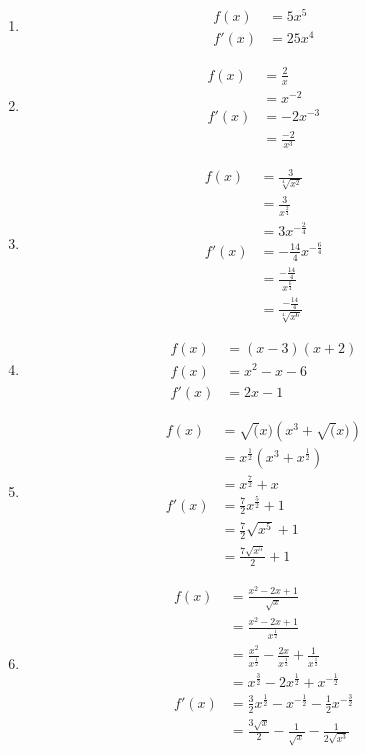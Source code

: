 \begin{enumerate}
	\item
	\begin{align*}
		f(x) &= 5x^5\\
		f'(x) &= 25x^4
	\end{align*}
	\item
	\begin{align*}
		f(x) &= \frac{2}{x}\\
		&= x^{-2}\\
		f'(x) &= -2x^{-3}\\
		&= \frac{-2}{x^3}
	\end{align*}
	\item 
	\begin{align*}
		f(x) &= \frac{3}{\sqrt[4]{x^2}}\\
		&= \frac{3}{x^{\frac{2}{4}}}\\
		&= 3x^{-\frac{2}{4}}\\
		f'(x) &= -\frac{14}{4}x^{-\frac{6}{4}}\\[0.5em]
		&= \frac{-\frac{14}{4}}{x^{\frac{6}{4}}}\\[0.5em]
		&= \frac{-\frac{14}{4}}{\sqrt[4]{x^6}}
	\end{align*}
	\item
	\begin{align*}
		f(x)&=(x-3)(x+2)\\
		f(x)&=x^2-x-6\\
		f'(x)&=2x-1
	\end{align*}
	\item
	\begin{align*}
		f(x) &= \sqrt(x) \left(x^3 + \sqrt(x) \right)\\
		&= x^{\frac{1}{2}} \left(x^3+x^{\frac{1}{2}}\right)\\
		&= x^{\frac{7}{2}} + x\\
		f'(x) &= \frac{7}{2}x^{\frac{5}{2}}+1\\
		&= \frac{7}{2} \sqrt{x^5} + 1\\
		&= \frac{7 \sqrt{x^5}}{2} + 1
	\end{align*}
	\item
	\begin{align*}
		f(x) &= \frac{x^2 - 2x + 1}{\sqrt{x}}\\
		&= \frac{x^2 - 2x + 1}{x^{\frac{1}{2}}}\\
		&= \frac{x^2}{x^{\frac{1}{2}}} - \frac{2x}{x^{\frac{1}{2}}} + \frac{1}{x^{\frac{1}{2}}}\\
		&= x^{\frac{3}{2}} - 2x^{\frac{1}{2}} + x^{-\frac{1}{2}}\\
		f'(x) &= \frac{3}{2}x^{\frac{1}{2}} - x^{-\frac{1}{2}} - \frac{1}{2}x^{-\frac{3}{2}}\\
		&= \frac{3\sqrt{x}}{2} - \frac{1}{\sqrt{x}} - \frac{1}{2\sqrt{x^3}}
	\end{align*}
\end{enumerate}


